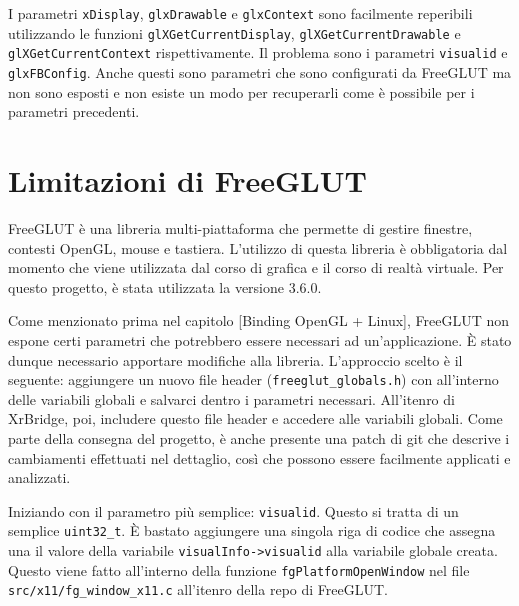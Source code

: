 \documentclass[twoside]{supsistudent}
\begin{document}
I parametri \texttt{xDisplay}, \texttt{glxDrawable} e \texttt{glxContext} sono facilmente reperibili utilizzando le funzioni \texttt{glXGetCurrentDisplay}, \texttt{glXGetCurrentDrawable} e \texttt{glXGetCurrentContext} rispettivamente. Il problema sono i parametri \texttt{visualid} e \texttt{glxFBConfig}. Anche questi sono parametri che sono configurati da FreeGLUT ma non sono esposti e non esiste un modo per recuperarli come è possibile per i parametri precedenti.

\section{Limitazioni di FreeGLUT}

FreeGLUT è una libreria multi-piattaforma che permette di gestire finestre, contesti OpenGL, mouse e tastiera. L'utilizzo di questa libreria è obbligatoria dal momento che viene utilizzata dal corso di grafica e il corso di realtà virtuale. Per questo progetto, è stata utilizzata la versione 3.6.0.


Come menzionato prima nel capitolo [Binding OpenGL + Linux], FreeGLUT non espone certi parametri che potrebbero essere necessari ad un'applicazione. È stato dunque necessario apportare modifiche alla libreria. L'approccio scelto è il seguente: aggiungere un nuovo file header (\texttt{freeglut\_globals.h}) con all'interno delle variabili globali e salvarci dentro i parametri necessari. All'itenro di XrBridge, poi, includere questo file header e accedere alle variabili globali. Come parte della consegna del progetto, è anche presente una patch di git che descrive i cambiamenti effettuati nel dettaglio, così che possono essere facilmente applicati e analizzati.

Iniziando con il parametro più semplice: \texttt{visualid}. Questo si tratta di un semplice \texttt{uint32\_t}. È bastato aggiungere una singola riga di codice che assegna una il valore della variabile \texttt{visualInfo->visualid} alla variabile globale creata. Questo viene fatto all'interno della funzione \texttt{fgPlatformOpenWindow} nel file \texttt{src/x11/fg\_window\_x11.c} all'itenro della repo di FreeGLUT.
\end{document}
